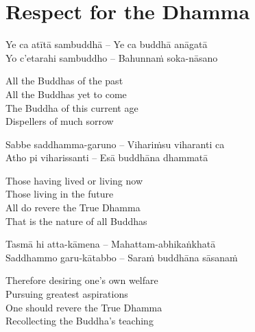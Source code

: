 
\section{Respect for the Dhamma}
\label{respect-for-the-dhamma}

\begin{leader}
\end{leader}

\begin{twochants}
  Ye ca atītā sambuddhā – Ye ca buddhā anāgatā \\
  Yo c'etarahi sambuddho – Bahunnaṁ soka-nāsano \\
\end{twochants}

\begin{english}
  All the Buddhas of the past\\
  All the Buddhas yet to come\\
  The Buddha of this current age\\
  Dispellers of much sorrow
\end{english}

\begin{twochants}
  Sabbe saddhamma-garuno – Vihariṁsu viharanti ca\\
  Atho pi viharissanti – Esā buddhāna dhammatā\\
\end{twochants}

\begin{english}
  Those having lived or living now\\
  Those living in the future\\
  All do revere the True Dhamma\\
  That is the nature of all Buddhas
\end{english}

\begin{twochants}
  Tasmā hi atta-kāmena – Mahattam-abhikaṅkhatā\\
  Saddhammo garu-kātabbo – Saraṁ buddhāna sāsanaṁ\\
\end{twochants}

\begin{english}
  Therefore desiring one's own welfare\\
  Pursuing greatest aspirations\\
  One should revere the True Dhamma\\
  Recollecting the Buddha's teaching
\end{english}

